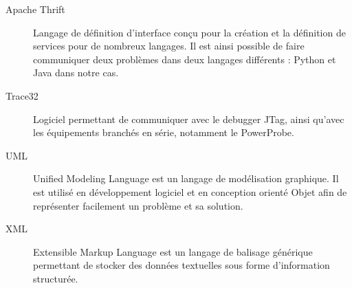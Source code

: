 \begin{description}
\item[Apache Thrift] Langage de définition d'interface conçu pour la création et la définition de services pour de nombreux langages. Il est ainsi possible de
	faire communiquer deux problèmes dans deux langages différents : Python et Java dans notre cas.
\item[Trace32] Logiciel permettant de communiquer avec le debugger JTag, ainsi qu'avec les équipements branchés en série, notamment le PowerProbe. 
\item[UML] Unified Modeling Language est un langage de modélisation graphique. Il est utilisé en développement logiciel et en conception orienté Objet afin de
	représenter facilement un problème et sa solution.
\item[XML] Extensible Markup Language est un langage de balisage générique permettant de stocker des données textuelles sous forme d'information structurée.
\end{description}

